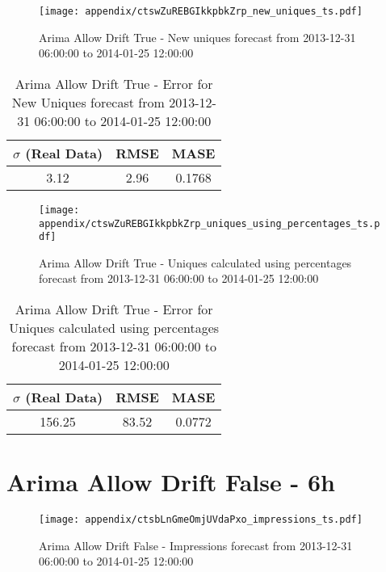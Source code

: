 \begin{figure}[H] \begin{center} \leavevmode
\texttt{[image: appendix/ctswZuREBGIkkpbkZrp\_new\_uniques\_ts.pdf]} \caption[]{
Arima Allow Drift True - New uniques forecast from 2013-12-31 06:00:00 to 2014-01-25 12:00:00} \label{fig:appendix/ctswZuREBGIkkpbkZrp_new_uniques_ts.pdf} \end{center}
\end{figure}

\begin{table}[H]
\centering
\footnotesize
\begin{tabular}{ccc}
$\sigma$ (Real Data) & RMSE & MASE   \\ \hline
3.12 & 2.96 & 0.1768 \\
\end{tabular}

\vspace{0.5cm}

\caption[]{
Arima Allow Drift True - Error for New Uniques forecast from 2013-12-31 06:00:00 to 2014-01-25 12:00:00}
\end{table}

\begin{figure}[H] \begin{center} \leavevmode
\texttt{[image: appendix/ctswZuREBGIkkpbkZrp\_uniques\_using\_percentages\_ts.pdf]} \caption[]{
Arima Allow Drift True - Uniques calculated using percentages forecast from 2013-12-31 06:00:00 to 2014-01-25 12:00:00} \label{fig:appendix/ctswZuREBGIkkpbkZrp_uniques_using_percentages_ts.pdf} \end{center}
\end{figure}

\begin{table}[H]
\centering
\footnotesize
\begin{tabular}{ccc}
$\sigma$ (Real Data) & RMSE & MASE   \\ \hline
156.25 & 83.52 & 0.0772 \\
\end{tabular}

\vspace{0.5cm}

\caption[]{
Arima Allow Drift True - Error for Uniques calculated using percentages forecast from 2013-12-31 06:00:00 to 2014-01-25 12:00:00}
\end{table}

\section{Arima Allow Drift False - 6h}
\begin{figure}[H] \begin{center} \leavevmode
\texttt{[image: appendix/ctsbLnGmeOmjUVdaPxo\_impressions\_ts.pdf]} \caption[]{
Arima Allow Drift False - Impressions forecast from 2013-12-31 06:00:00 to 2014-01-25 12:00:00} \label{fig:appendix/ctsbLnGmeOmjUVdaPxo_impressions_ts.pdf} \end{center}
\end{figure}

